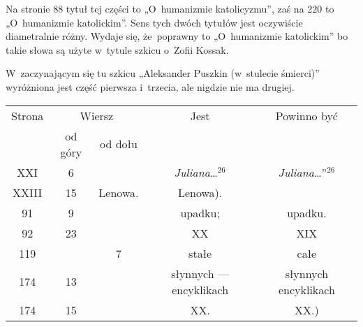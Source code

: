 \documentclass[a4paper,11pt]{article}
\begin{document}


\start {} Na stronie 88 tytuł tej części to „O~humanizmie
katolicyzmu”, zaś na 220 to „O~humanizmie katolickim”. Sens tych dwóch
tytułów jest oczywiście diametralnie różny. Wydaje się, że~poprawny to
„O~humanizmie katolickim” bo takie słowa są użyte w~tytule szkicu
o~Zofii Kossak.

\vspace{\spaceFour}



\start {} W~zaczynającym się tu szkicu „Aleksander Puszkin
(w~stulecie śmierci)” wyróżniona jest część pierwsza i~trzecia, ale
nigdzie nie ma drugiej.

\vspace{\spaceFour}







\begin{center}

  \begin{tabular}{|c|c|c|c|c|}
    \hline
    Strona & \multicolumn{2}{c|}{Wiersz} & Jest
                              & Powinno być \\ \cline{2-3}
    & od góry & od dołu & & \\
    \hline
    XXI   &  6 & & \textit{Juliana}\ldots$^{ 26 }$
           & \textit{Juliana}\ldots”$^{ 26 }$ \\
    XXIII & 15 & Lenowa. & Lenowa). \\
    91  &  9 & & upadku; & upadku. \\
    92  & 23 & & XX & XIX \\
    119 & & 7 & stałe & całe \\
    174 & 13 & & słynnych --- encyklikach & słynnych encyklikach \\
    174 & 15 & & XX. & XX.) \\
    \hline
  \end{tabular}

\end{center}

\vspace{\spaceTwo}
\end{document}
